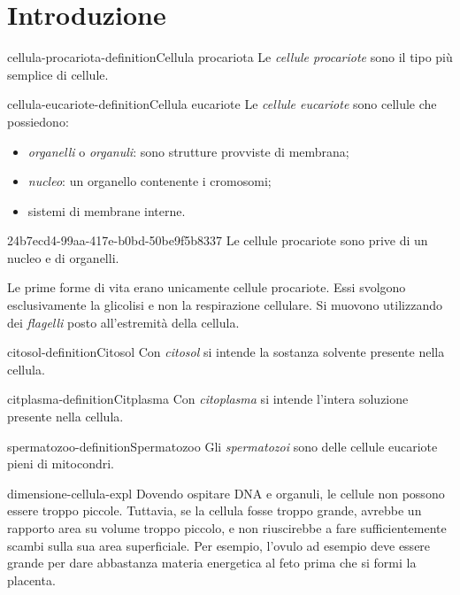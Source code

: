 \documentclass[preview]{standalone}
\begin{document}
\genpage

\section{Introduzione}

\begin{snippetdefinition}{cellula-procariota-definition}{Cellula procariota}
    Le \textit{cellule procariote} sono il tipo più semplice di cellule.
\end{snippetdefinition}

\begin{snippetdefinition}{cellula-eucariote-definition}{Cellula eucariote}
    Le \textit{cellule eucariote} sono cellule
    che possiedono:
    \begin{itemize}
        \item \textit{organelli} o \textit{organuli}: sono strutture provviste di membrana;
        \item \textit{nucleo}: un organello contenente i cromosomi;
        \item sistemi di membrane interne.
    \end{itemize}
\end{snippetdefinition}

\begin{snippet}{24b7ecd4-99aa-417e-b0bd-50be9f5b8337}
    Le cellule procariote sono prive di un nucleo e di organelli.

    Le prime forme di vita erano unicamente cellule procariote.
    Essi svolgono esclusivamente la glicolisi e non la respirazione cellulare.
    Si muovono utilizzando dei \textit{flagelli} posto all'estremità della cellula.
\end{snippet}


\begin{snippetdefinition}{citosol-definition}{Citosol}
    Con \textit{citosol} si intende la sostanza solvente presente nella cellula.
\end{snippetdefinition}

\begin{snippetdefinition}{citplasma-definition}{Citplasma}
    Con \textit{citoplasma} si intende l'intera soluzione presente nella cellula.
\end{snippetdefinition}

\begin{snippetdefinition}{spermatozoo-definition}{Spermatozoo}
    Gli \textit{spermatozoi} sono delle cellule eucariote pieni di mitocondri.
\end{snippetdefinition}

\begin{snippet}{dimensione-cellula-expl}
    Dovendo ospitare DNA e organuli, le cellule non possono essere troppo piccole.
    Tuttavia, se la cellula fosse troppo grande, avrebbe un rapporto area su volume troppo piccolo, e non riuscirebbe
    a fare sufficientemente scambi sulla sua area superficiale.
    Per esempio, l'ovulo ad esempio deve essere grande per dare
    abbastanza materia energetica al feto prima che si
    formi la placenta.
\end{snippet}
\end{document}
